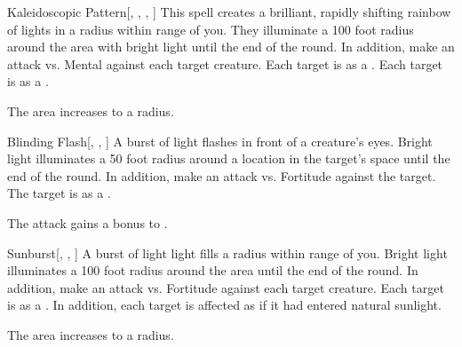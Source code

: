 \lowercase{\hypertarget{spell:Kaleidoscopic Pattern}{}}\label{spell:Kaleidoscopic Pattern}
\begin{freeability}[Rank 5]{\hypertarget{spell:Kaleidoscopic Pattern}{Kaleidoscopic Pattern}}[, , , ]
This spell creates a brilliant, rapidly shifting rainbow of lights in a \areasmall radius within \rngmed range of you.
They illuminate a 100 foot radius around the area with bright light until the end of the round.
In addition, make an attack vs. Mental against each target creature.
\hit Each target is \dazed as a .
\crit Each target is \disoriented as a .

\rankline
{} The area increases to a \areamed radius.
\end{freeability}
\vspace{0.25em}



\lowercase{\hypertarget{spell:Blinding Flash}{}}\label{spell:Blinding Flash}
\begin{freeability}[Rank 6]{\hypertarget{spell:Blinding Flash}{Blinding Flash}}[, , ]
A burst of light flashes in front of a creature's eyes.
Bright light illuminates a 50 foot radius around a location in the target's space until the end of the round.
In addition, make an attack vs. Fortitude against the target.
\hit The target is  as a .

\rankline
{} The attack gains a  bonus to .
\end{freeability}
\vspace{0.25em}



\lowercase{\hypertarget{spell:Sunburst}{}}\label{spell:Sunburst}
\begin{freeability}[Rank 6]{\hypertarget{spell:Sunburst}{Sunburst}}[, , ]
A burst of light light fills a \areamed radius  within \rngmed range of you.
Bright light illuminates a 100 foot radius around the area until the end of the round.
In addition, make an attack vs. Fortitude against each target creature.
\hit Each target is \dazzled as a .
In addition, each target is affected as if it had entered natural sunlight.

\rankline
{} The area increases to a \arealarge radius.
\end{freeability}
\vspace{0.25em}



